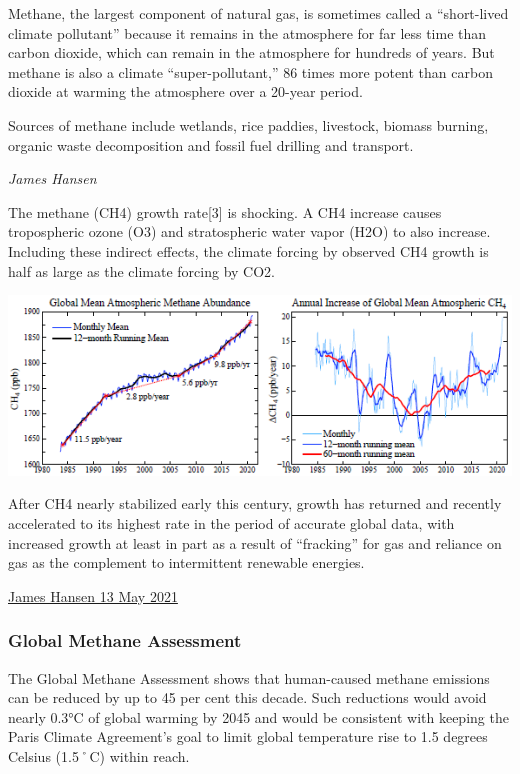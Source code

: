 \documentclass[
]{book}
\begin{document}
Methane, the largest component of natural gas, is sometimes called a ``short-lived climate pollutant'' because it remains in the atmosphere for far less time than carbon dioxide, which can remain in the atmosphere for hundreds of years. But methane is also a climate ``super-pollutant,'' 86 times more potent than carbon dioxide at warming the atmosphere over a 20-year period.

Sources of methane include wetlands, rice paddies, livestock, biomass burning, organic waste decomposition and fossil fuel drilling and transport.

\emph{James Hansen}

The methane (CH4) growth rate{[}3{]} is shocking.
A CH4 increase causes tropospheric ozone (O3) and stratospheric water vapor (H2O)
to also increase.
Including these indirect effects, the climate forcing by observed CH4 growth
is half as large as the climate forcing by CO2.

\includegraphics{fig/CH4_Annual_Increase.png}

After CH4 nearly stabilized early this century, growth has returned and recently accelerated to its highest rate in the period of accurate global data, with increased growth at least in part as a result of ``fracking'' for gas and reliance on gas as the complement to intermittent renewable energies.

\href{https://mailchi.mp/caa/the-world-has-cooled-off-whats-the-significance}{James Hansen 13 May 2021}

\hypertarget{global-methane-assessment}{%
\subsubsection{Global Methane Assessment}\label{global-methane-assessment}}

The Global Methane Assessment shows that human-caused methane emissions can be reduced by up to 45 per cent this decade. Such reductions would avoid nearly 0.3°C of global warming by 2045 and would be consistent with keeping the Paris Climate Agreement's goal to limit global temperature rise to 1.5 degrees Celsius (1.5˚C) within reach.
\end{document}
